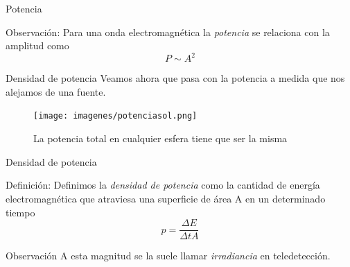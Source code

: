 \documentclass[]{beamer}
\begin{document}
\begin{frame}{Potencia}
  \begin{block}{Observación:}
    Para una onda electromagnética la \emph{potencia} se relaciona con la amplitud como
    \begin{equation}
      P \sim A^2
    \end{equation}
  \end{block}
\end{frame}

\begin{frame}{Densidad de potencia}
  Veamos ahora que pasa con la potencia a medida que nos alejamos de una fuente.
  \begin{figure}
    \texttt{[image: imagenes/potenciasol.png]}
    \caption{La potencia total en cualquier esfera tiene que ser la misma}
  \end{figure}
\end{frame}

\begin{frame}{Densidad de potencia}
  \begin{block}{Definición:}
    Definimos la \emph{densidad de potencia} como la cantidad de energía electromagnética que atraviesa una superficie de área A en un determinado tiempo
    \begin{equation}
      p = \frac{\Delta E}{\Delta t A}
    \end{equation}
  \end{block}\pause
  \begin{block}{Observación}
    A esta magnitud se la suele llamar \emph{irradiancia} en teledetección.
  \end{block}
\end{frame}

\end{document}
